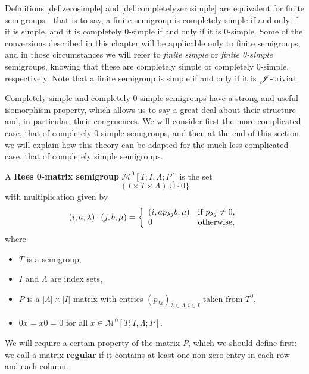 Definitions \ref{def:zerosimple} and \ref{def:completelyzerosimple} are
equivalent for finite semigroups---that is to say, a finite semigroup is
completely simple if and only if it is simple, and it is completely 0-simple if
and only if it is 0-simple.  Some of the conversions described in this chapter
will be applicable only to finite semigroups, and in those circumstances we will
refer to \textit{finite simple} or \textit{finite 0-simple} semigroups, knowing
that these are completely simple or completely 0-simple, respectively.
Note that a finite semigroup is simple if and only if it is $\mathrel{\mathscr{J}}$-trivial.

Completely simple and completely 0-simple semigroups have a strong and useful
isomorphism property, which allows us to say a great deal about their structure
and, in particular, their congruences.  We will consider first the more
complicated case, that of completely 0-simple semigroups, and then at the end of
this section we will explain how this theory can be adapted for the much less
complicated case, that of completely simple semigroups.

\begin{definition}
  \label{def:rzms}
  A \textbf{Rees 0-matrix semigroup} $\mathcal{M}^0[T;I,\Lambda;P]$ is the set
  $$(I \times T \times \Lambda) \cup \{0\}$$
  with multiplication given by
  $$(i,a,\lambda) \cdot (j,b,\mu) = \left\{
    \begin{array}{l l}
      (i,ap_{\lambda j}b, \mu) & \text{if~} p_{\lambda j} \neq 0, \\
      0 & \text{otherwise,}
    \end{array}
  \right.$$
  where
  \begin{itemize}
  \item $T$ is a semigroup,
  \item $I$ and $\Lambda$ are index sets,
  \item $P$ is a $|\Lambda| \times |I|$ matrix with entries $(p_{\lambda
      i})_{\lambda \in \Lambda, i \in I}$
    taken from $T^0$,
  \item $0x=x0=0$ for all $x \in \mathcal{M}^0[T;I,\Lambda;P]$.
  \end{itemize}
\end{definition}

We will require a certain property of the matrix $P$, which we should define
first: we call a matrix \textbf{regular}  if it contains
at least one non-zero entry in each row and each column.

